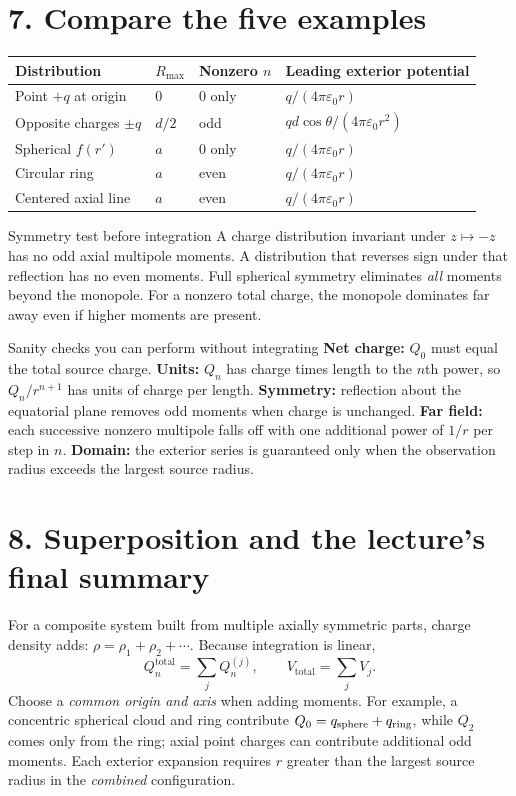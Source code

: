 \documentclass[10pt,letterpaper]{article}
\newcommand{\eps}{\varepsilon_0}\newcommand{\dd}{\mathrm d}
\begin{document}
\section*{7. Compare the five examples}
\begin{center}\small\begin{tabular}{p{.27\linewidth}p{.14\linewidth}p{.19\linewidth}p{.28\linewidth}}\toprule
Distribution & $R_{\max}$ & Nonzero $n$ & Leading exterior potential\\\midrule
Point $+q$ at origin & $0$ & $0$ only & $q/(4\pi\eps r)$\\
Opposite charges $\pm q$ & $d/2$ & odd & $qd\cos\theta/(4\pi\eps r^2)$\\
Spherical $f(r')$ & $a$ & $0$ only & $q/(4\pi\eps r)$\\
Circular ring & $a$ & even & $q/(4\pi\eps r)$\\
Centered axial line & $a$ & even & $q/(4\pi\eps r)$\\\bottomrule
\end{tabular}\end{center}
\begin{insight}{Symmetry test before integration}
A charge distribution invariant under $z\mapsto-z$ has no odd axial multipole moments. A distribution that reverses sign under that reflection has no even moments. Full spherical symmetry eliminates \emph{all} moments beyond the monopole. For a nonzero total charge, the monopole dominates far away even if higher moments are present.
\end{insight}
\begin{insight}{Sanity checks you can perform without integrating}
\textbf{Net charge:} $Q_0$ must equal the total source charge. \textbf{Units:} $Q_n$ has charge times length to the $n$th power, so $Q_n/r^{n+1}$ has units of charge per length. \textbf{Symmetry:} reflection about the equatorial plane removes odd moments when charge is unchanged. \textbf{Far field:} each successive nonzero multipole falls off with one additional power of $1/r$ per step in $n$. \textbf{Domain:} the exterior series is guaranteed only when the observation radius exceeds the largest source radius.
\end{insight}
\section*{8. Superposition and the lecture's final summary}
For a composite system built from multiple axially symmetric parts, charge density adds: $\rho=\rho_1+\rho_2+\cdots$. Because integration is linear,
\[\boxed{Q_n^{\mathrm{total}}=\sum_jQ_n^{(j)}},\qquad\boxed{V_{\mathrm{total}}=\sum_jV_j}.\]
Choose a \emph{common origin and axis} when adding moments. For example, a concentric spherical cloud and ring contribute $Q_0=q_{\rm sphere}+q_{\rm ring}$, while $Q_2$ comes only from the ring; axial point charges can contribute additional odd moments. Each exterior expansion requires $r$ greater than the largest source radius in the \emph{combined} configuration.
\end{document}
